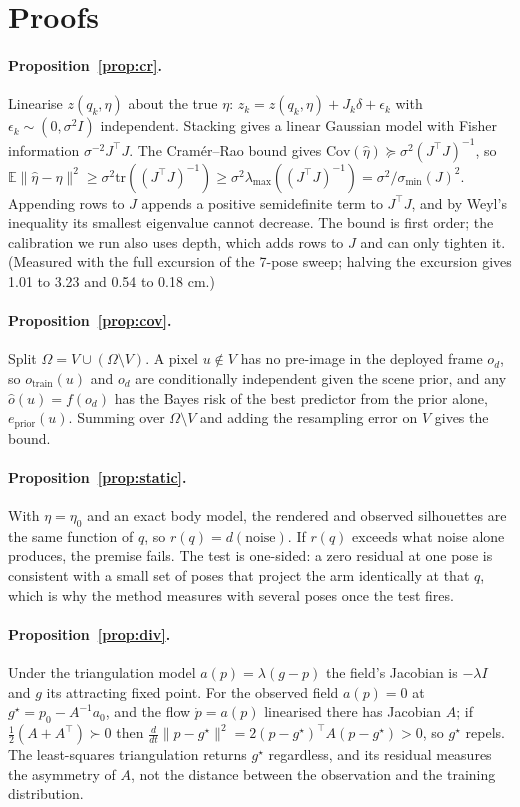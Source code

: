 \documentclass{article}
\begin{document}
\section{Proofs}
\label{app:proofs}
\paragraph{Proposition~\ref{prop:cr}.} Linearise $z(q_k, \eta)$ about the true $\eta$: $z_k = z(q_k,\eta) + J_k
\delta + \epsilon_k$ with $\epsilon_k \sim (0, \sigma^2 I)$ independent. Stacking gives a linear Gaussian model with
Fisher information $\sigma^{-2} J^\top J$. The Cram\'er--Rao bound gives $\mathrm{Cov}(\hat\eta) \succeq \sigma^2
(J^\top J)^{-1}$, so $\mathbb{E}\|\hat\eta-\eta\|^2 \ge \sigma^2 \mathrm{tr}((J^\top J)^{-1}) \ge \sigma^2
\lambda_{\max}((J^\top J)^{-1}) = \sigma^2/\sigma_{\min}(J)^2$. Appending rows to $J$ appends a positive semidefinite
term to $J^\top J$, and by Weyl's inequality its smallest eigenvalue cannot decrease. The bound is first order; the
calibration we run also uses depth, which adds rows to $J$ and can only tighten it. (Measured with the full excursion of
the 7-pose sweep; halving the excursion gives 1.01 to 3.23 and 0.54 to 0.18 cm.)

\paragraph{Proposition~\ref{prop:cov}.} Split $\Omega = V \cup (\Omega\setminus V)$. A pixel $u \notin V$ has no
pre-image in the deployed frame $o_d$, so $o_{\mathrm{train}}(u)$ and $o_d$ are conditionally independent given the
scene prior, and any $\hat o(u) = f(o_d)$ has the Bayes risk of the best predictor from the prior alone,
$e_{\mathrm{prior}}(u)$. Summing over $\Omega\setminus V$ and adding the resampling error on $V$ gives the bound.

\paragraph{Proposition~\ref{prop:static}.} With $\eta = \eta_0$ and an exact body model, the rendered and observed
silhouettes are the same function of $q$, so $r(q) = d(\text{noise})$. If $r(q)$ exceeds what noise alone produces, the
premise fails. The test is one-sided: a zero residual at one pose is consistent with a small set of poses that project
the arm identically at that $q$, which is why the method measures with several poses once the test fires.

\paragraph{Proposition~\ref{prop:div}.} Under the triangulation model $a(p) = \lambda(g - p)$ the field's Jacobian is
$-\lambda I$ and $g$ its attracting fixed point. For the observed field $a(p) = 0$ at $g^\star = p_0 - A^{-1} a_0$, and
the flow $\dot p = a(p)$ linearised there has Jacobian $A$; if $\tfrac12(A + A^\top) \succ 0$ then $\tfrac{d}{dt}\|p -
g^\star\|^2 = 2 (p-g^\star)^\top A (p - g^\star) > 0$, so $g^\star$ repels. The least-squares triangulation returns
$g^\star$ regardless, and its residual measures the asymmetry of $A$, not the distance between the observation and the
training distribution.
\end{document}
